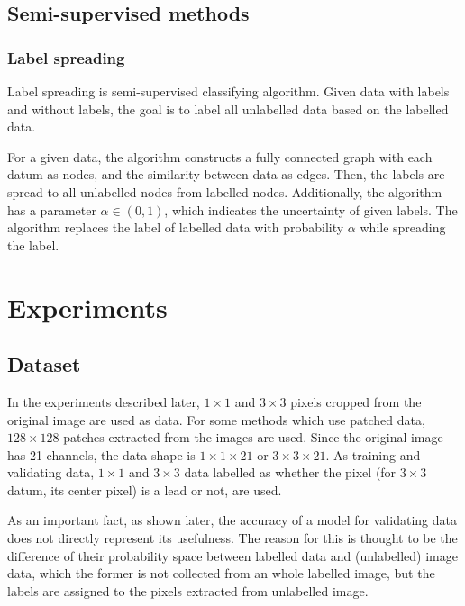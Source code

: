 \documentclass{article}
\begin{document}
    \subsection{Semi-supervised methods}
        \subsubsection{Label spreading}
            Label spreading \cite{label} is semi-supervised classifying algorithm.
            Given data with labels and without labels,
            the goal is to label all unlabelled data based on the labelled data.

            For a given data, the algorithm constructs a
            fully connected graph with each datum as nodes,
            and the similarity between data as edges.
            Then, the labels are spread to all unlabelled nodes from labelled nodes.
            Additionally, the algorithm has a parameter
            $\alpha \in (0, 1)$, which indicates the uncertainty of given labels.
            The algorithm replaces the label of labelled data
            with probability $\alpha$ while spreading the label.

\section{Experiments} \label{sec:experiments}
    \subsection{Dataset}
        In the experiments described later,
        $1\times 1$ and $3\times 3$ pixels cropped from the original image
        are used as data.
        For some methods which use patched data,
        $128\times 128$ patches extracted from the images are used.
        Since the original image has 21 channels,
        the data shape is $1\times 1\times 21$ or $3\times 3\times 21$.
        As training and validating data,
        $1\times 1$ and $3\times 3$ data labelled as whether
        the pixel (for $3\times 3$ datum, its center pixel)
        is a lead or not, are used.

        As an important fact, as shown later,
        the accuracy of a model for validating data does not
        directly represent its usefulness.
        The reason for this is thought to be the difference of their
        probability space between labelled data and (unlabelled) image data,
        which the former is not collected from an whole labelled image,
        but the labels are assigned to the pixels extracted from unlabelled image.
\end{document}
